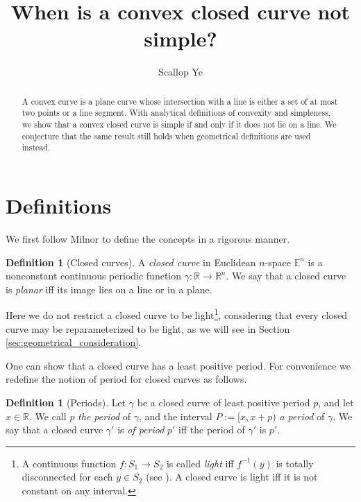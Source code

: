 \documentclass{amsart}
\title{When is a convex closed curve not simple?}
\author{Scallop Ye}
\theoremstyle{definition}
\newtheorem{definition}[proposition]{Definition}
\theoremstyle{remark}
\begin{document}
\begin{abstract}
    A convex curve is a plane curve whose intersection with a
    line is either a set of at most two points or a line segment.
    With analytical definitions of convexity and simpleness,
    we show that a convex closed curve is simple
    if and only if it does not lie on a line.
    We conjecture that the same result still holds when
    geometrical definitions are used instead.
\end{abstract}

\maketitle

\section{Definitions}

We first follow Milnor \cite{milnor} to
define the concepts in a rigorous manner.

\begin{definition}[Closed curves]
    A \emph{closed curve} in Euclidean $n$-space $\mathbb{E}^n$
    is a nonconstant continuous periodic function
    $\gamma:\mathbb{R}\to\mathbb{R}^n$. We say that a closed curve
    is \emph{planar} iff its image lies on a line or in a plane.
\end{definition}

Here we do not restrict a closed curve to be light\footnote{
    A continuous function $f:S_1\to S_2$ is called \emph{light}
    iff $f^{-1}(y)$ is totally disconnected for each $y\in S_2$
    (see \cite[Definition 13.1]{nadler}). A closed curve
    is light iff it is not constant on any interval.
}, considering that every closed curve may be
reparameterized to be light, as we will see in Section
\ref{sec:geometrical_consideration}.

One can show that a closed curve has a least positive period.
For convenience we redefine the notion of period for closed curves
as follows.

\begin{definition}[Periods]
    Let $\gamma$ be a closed curve of least positive period $p$,
    and let $x\in\mathbb{R}$. We call $p$ \emph{the period} of $\gamma$,
    and the interval $P:=[x,x+p)$ \emph{a period} of $\gamma$.
    We say that a closed curve $\gamma'$ is \emph{of period} $p'$
    iff the period of $\gamma'$ is $p'$.
\end{definition}
\end{document}
